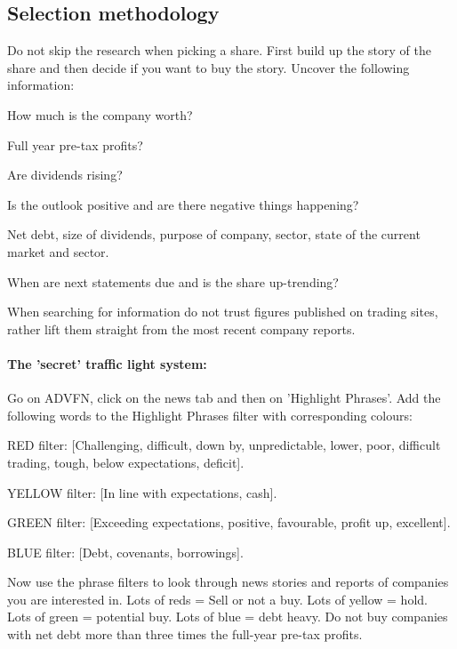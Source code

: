 \subsection*{Selection methodology}
Do not skip the research when picking a share. 
First build up the story of the share and then decide if you want to buy the story.
Uncover the following information:
\begin{enumerate*}
\item How much is the company worth?
\item Full year pre-tax profits?
\item Are dividends rising?
\item Is the outlook positive and are there negative things happening?
\item Net debt, size of dividends, purpose of company, sector, state of the current market and sector.
\item When are next statements due and is the share up-trending?
\end{enumerate*}
When searching for information do not trust figures published on trading sites, rather lift them straight from the most recent company reports.

\paragraph{The 'secret' traffic light system:} Go on ADVFN, click on the news tab and then on 'Highlight Phrases'.
Add the following words to the Highlight Phrases filter with corresponding colours:
\begin{enumerate*}
\item RED filter: [Challenging, difficult, down by, unpredictable, lower, poor, difficult trading, tough, below expectations, deficit].
\item YELLOW filter: [In line with expectations, cash].
\item GREEN filter: [Exceeding expectations, positive, favourable, profit up, excellent].
\item BLUE filter: [Debt, covenants, borrowings].
\end{enumerate*}
Now use the phrase filters to look through news stories and reports of companies you are interested in.
Lots of reds = Sell or not a buy. 
Lots of yellow = hold.
Lots of green = potential buy.
Lots of blue = debt heavy.
Do not buy companies with net debt more than three times the full-year pre-tax profits.

